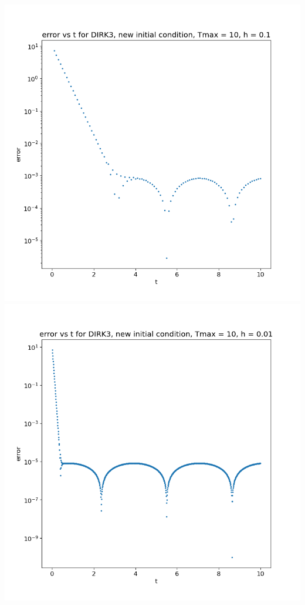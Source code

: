 \documentclass{article}
\begin{document}
\begin{enumerate}[label=(\alph*)]
\begin{center}
	\includegraphics[scale=.3]{hw3 dirk3 err vs t graph 1}
	\includegraphics[scale=.3]{hw3 dirk3 err vs t graph 2}

\end{center}
\end{enumerate}
\end{document}
